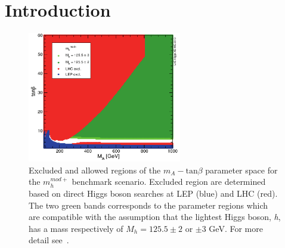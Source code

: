 \clearpage

\section{Introduction}
\label{sec:strategy}


\begin{figure}[tp]
     \begin{center}

            \includegraphics[width=0.6\textwidth]{figure/mh_mod.png}

    \end{center}
    \caption{Excluded and allowed regions of the $m_{A} - \text{tan}\beta$ parameter space for the  $m_{h}^{mod+}$ 
	benchmark scenario. Excluded region are determined based on direct Higgs boson searches at LEP (blue) and LHC (red). The two green 
	bands corresponds to the parameter regions which are compatible with the assumption that 
	the lightest Higgs boson, \emph{h}, has a mass respectively of $M_{h} = 125.5 \pm 2$ or $\pm 3$ GeV. For more detail 
	see~\cite{LHCxsec}.}
   \label{fig:mhmod}
\end{figure}


